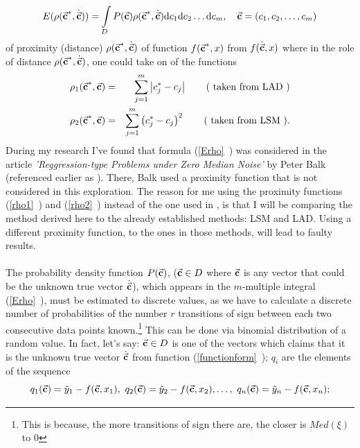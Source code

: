 \begin{equation}
E(\rho(\vec{\textbf{c}}^{*},\dot{\vec{\textbf{c}}}))= \int\limits_{D}P(\vec{\textbf{c}})\rho(\vec{\textbf{c}}^{*},\dot{\vec{\textbf{c}}})\mathrm{d}c_{1}\mathrm{d}c_{2}\dots \mathrm{d}c_{m}, \quad \vec{\textbf{c}} = (c_{1},c_{2},\dots,c_{m}) \label{Erho}
\end{equation}
of proximity (distance) $\rho(\vec{\textbf{c}}^{*},\dot{\vec{\textbf{c}}})$ of function $f(\vec{\textbf{c}}^{*},x)$ from $f(\dot{\vec{\textbf{c}}},x)$ where in the role of distance $\rho(\vec{\textbf{c}}^{*},\dot{\vec{\textbf{c}}})$, one could take on of the functions
\begin{eqnarray}
\rho_{1}(\vec{\textbf{c}}^{*},\vec{\textbf{c}}) &=& \sum\limits_{j=1}^{m} \left| c_{j}^{*}-c_{j} \right| \label{rho1} \qquad \text{( taken from LAD )}\\
\rho_{2}(\vec{\textbf{c}}^{*},\vec{\textbf{c}}) &=& \sum\limits_{j=1}^{m} \left( c_{j}^{*}-c_{j} \right)^{2} \label{rho2} \qquad \text{( taken from LSM ).}
\end{eqnarray}
During my research I've found that formula (\vref{Erho}~) was considered in the article \textit{'Reggression-type Problems under Zero Median Noise'} by Peter Balk (referenced earlier as  \citep{balk_2010}). There, Balk used a proximity function that is not considered in this exploration. The reason for me using the proximity functions (\vref{rho1}~) and (\vref{rho2}~) instead of the one used in  \citep{balk_2010}, is that I will be comparing the method derived here to the already established methods: LSM and LAD. Using a different proximity function, to the ones in those methods, will lead to faulty results.\\
\\
The probability density function $P(\vec{\textbf{c}})$, ($\vec{\textbf{c}} \in D$ where $\vec{\textbf{c}}$ is any vector that could be the unknown true vector $\dot{\vec{\textbf{c}}}$), which appears in the $m$-multiple integral (\vref{Erho}~), must be estimated to discrete values, as we have to calculate a discrete number of probabilities of the number $r$ transitions of sign between each two consecutive data points known.\footnote{This is because, the more transitions of sign there are, the closer is $Med(\xi)$ to 0} This can be done via binomial distribution of a random value. In fact, let's say: $\vec{\textbf{c}} \in D$ is one of the vectors which claims that it is the unknown true vector $ \dot{\vec{\textbf{c}}}$ from function (\vref{functionform}~); $q_{i}$ are the elements of the sequence
\begin{equation}
q_{1}(\vecc)=\tilde{y}_{1}-f(\vecc,x_{1}),\ q_{2}(\vecc)=\tilde{y}_{2}-f(\vecc,x_{2}), \dots, \ q_{n}(\vecc)=\tilde{y}_{n}-f(\vecc,x_{n}); \label{sequence}
\end{equation}
